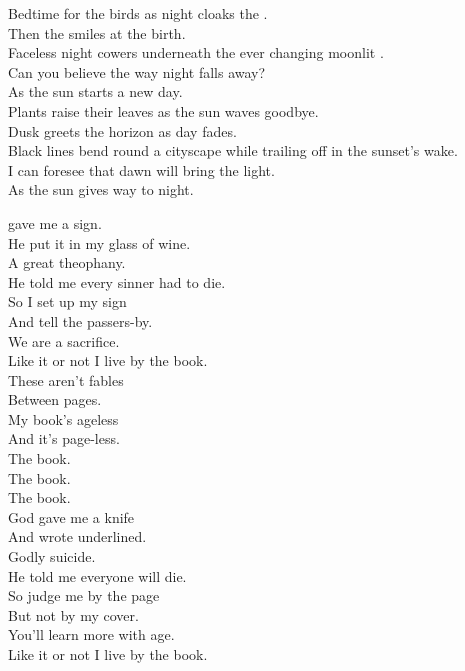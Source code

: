 Bedtime for the birds as night cloaks the . \\
Then the  smiles at the  birth. \\
Faceless night cowers underneath the ever changing moonlit . \\
Can you believe the way night falls away? \\
As the sun starts a new day. \\

Plants raise their leaves as the sun waves goodbye. \\
Dusk greets the horizon as day fades. \\
Black lines bend round a cityscape while trailing off in the sunset's wake. \\
I can foresee that dawn will bring the light. \\
As the sun gives way to night. \\





 gave me a sign. \\
He put it in my glass of wine. \\
A great theophany. \\
He told me every sinner had to die. \\
So I set up my sign \\
And tell the passers-by. \\
We are a sacrifice. \\
Like it or not I live by the book. \\

These aren't fables \\
Between pages. \\
My book's ageless \\
And it's page-less. \\

The book. \\
The book. \\
The book. \\

God gave me a knife \\
And wrote  underlined. \\
Godly suicide. \\
He told me everyone will die. \\
So judge me by the page \\
But not by my cover. \\
You'll learn more with age. \\
Like it or not I live by the book. \\

